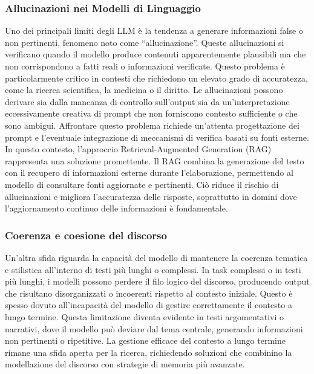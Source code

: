 \documentclass[target=mst,aauheader=,style=]{thud}
\begin{document}
\subsubsection{Allucinazioni nei Modelli di Linguaggio}
Uno dei principali limiti degli LLM è la tendenza a generare informazioni false o non pertinenti, fenomeno noto come “allucinazione”. Queste allucinazioni si verificano quando il modello produce contenuti apparentemente plausibili ma che non corrispondono a fatti reali o informazioni verificate. Questo problema è particolarmente critico in contesti che richiedono un elevato grado di accuratezza, come la ricerca scientifica, la medicina o il diritto. Le allucinazioni possono derivare sia dalla mancanza di controllo sull'output sia da un’interpretazione eccessivamente creativa di prompt che non forniscono contesto sufficiente o che sono ambigui. Affrontare questo problema richiede un’attenta progettazione dei prompt e l’eventuale integrazione di meccanismi di verifica basati su fonti esterne. In questo contesto, l’approccio Retrieval-Augmented Generation (RAG) rappresenta una soluzione promettente. Il RAG combina la generazione del testo con il recupero di informazioni esterne durante l’elaborazione, permettendo al modello di consultare fonti aggiornate e pertinenti. Ciò riduce il rischio di allucinazioni e migliora l’accuratezza delle risposte, soprattutto in domini dove l’aggiornamento continuo delle informazioni è fondamentale.

\subsubsection{Coerenza e coesione del discorso}
Un’altra sfida riguarda la capacità del modello di mantenere la coerenza tematica e stilistica all'interno di testi più lunghi o complessi. In task complessi o in testi più lunghi, i modelli possono perdere il filo logico del discorso, producendo output che risultano disorganizzati o incoerenti rispetto al contesto iniziale. Questo è spesso dovuto all’incapacità del modello di gestire correttamente il contesto a lungo termine. Questa limitazione diventa evidente in testi argomentativi o narrativi, dove il modello può deviare dal tema centrale, generando informazioni non pertinenti o ripetitive. La gestione efficace del contesto a lungo termine rimane una sfida aperta per la ricerca, richiedendo soluzioni che combinino la modellazione del discorso con strategie di memoria più avanzate.
\end{document}
